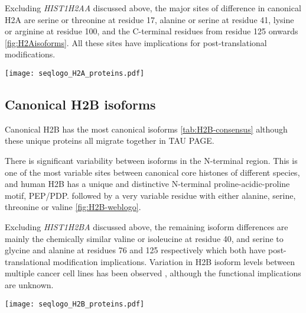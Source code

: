 	Excluding \textit{HIST1H2AA} discussed above, 
	the major sites of difference in canonical H2A are 
	serine or threonine at residue 17, 
	alanine or serine at residue 41, 
	lysine or arginine at residue 100, 
	and the C-terminal residues from residue 125 onwards \ref{fig:H2Aisoforms}. 
	All these sites have implications for post-translational modifications. 
	
  \begin{TableAndFigure*}
	\label{tab:H2A-consensus}
	
	\label{fig:H2A-weblogo}
	\texttt{[image: seqlogo\_H2A\_proteins.pdf]}
  \end{TableAndFigure*}

  \subsection{Canonical H2B isoforms}
	Canonical H2B has the most canonical isoforms \ref{tab:H2B-consensus} 
	although these \HTwoBUniqueProteins{} unique proteins all migrate together in TAU PAGE.

	There is significant variability between isoforms in the N-terminal region. 
	This is one of the most variable sites between canonical core histones of different species, and
	human H2B has a unique and distinctive N-terminal proline-acidic-proline motif, PEP/PDP. 
	followed by a very variable residue with either alanine, serine, threonine or valine \ref{fig:H2B-weblogo}. 

	Excluding \textit{HIST1H2BA} discussed above, 
	the remaining isoform differences are mainly the chemically similar valine or isoleucine at residue 40, 
	and serine to glycine and alanine at residues 76 and 125 respectively 
	which both have post-translational modification implications. 
	Variation in H2B isoform levels between multiple cancer cell lines has been observed \citep{Molden2015}, 
	although the functional implications are unknown.

  \begin{TableAndFigure*}
	\label{tab:H2B-consensus}
	
	\label{fig:H2B-weblogo}
	\texttt{[image: seqlogo\_H2B\_proteins.pdf]}
  \end{TableAndFigure*}

